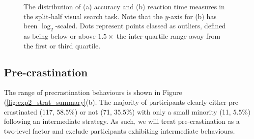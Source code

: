 \documentclass[]{rsos}
\begin{document}
\begin{figure}[t]
  \centering  
  \caption{The distribution of (a) accuracy and (b) reaction time measures in the split-half visual search task. Note that the $y$-axis for (b) has been $\log_2$-scaled. Dots represent points classed as outliers, defined as being below or above $1.5 \times$ the inter-quartile range away from the first or third quartile.}
  \label{fig:exp2_summary}
\end{figure}

\subsection{Pre-crastination}

The range of precrastination behaviours is shown in Figure (\ref{fig:exp2_strat_summary}(b). The majority of participants clearly either pre-crastinated (117, $58.5\%$) or not (71, $35.5\%$) with only a small minority (11, $5.5\%$) following an intermediate strategy. As such, we will treat pre-crastination as a two-level factor and exclude participants exhibiting intermediate behaviours. 
\end{document}
